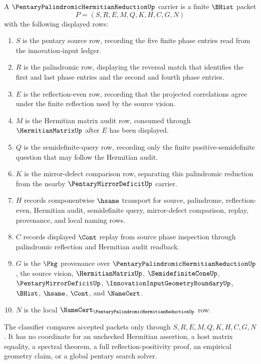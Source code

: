 \begin{definition}
\label{def:pentary-palindromic-hermitian-reduction-carrier}
A $\PentaryPalindromicHermitianReductionUp$ carrier is a finite $\BHist$ packet
$$
P=(S,R,E,M,Q,K,H,C,G,N)
$$
with the following displayed rows:
\begin{enumerate}
\item $S$ is the pentary source row, recording the five finite phase entries read from the innovation-input ledger.
\item $R$ is the palindromic row, displaying the reversal match that identifies the first and last phase entries and the second and fourth phase entries.
\item $E$ is the reflection-even row, recording that the projected correlations agree under the finite reflection used by the source vision.
\item $M$ is the Hermitian matrix audit row, consumed through $\HermitianMatrixUp$ after $E$ has been displayed.
\item $Q$ is the semidefinite-query row, recording only the finite positive-semidefinite question that may follow the Hermitian audit.
\item $K$ is the mirror-defect comparison row, separating this palindromic reduction from the nearby $\PentaryMirrorDeficitUp$ carrier.
\item $H$ records componentwise $\hsame$ transport for source, palindrome, reflection-even, Hermitian audit, semidefinite query, mirror-defect comparison, replay, provenance, and local naming rows.
\item $C$ records displayed $\Cont$ replay from source phase inspection through palindromic reflection and Hermitian audit readback.
\item $G$ is the $\Pkg$ provenance over $\PentaryPalindromicHermitianReductionUp$, the source vision, $\HermitianMatrixUp$, $\SemidefiniteConeUp$, $\PentaryMirrorDeficitUp$, $\InnovationInputGeometryBoundaryUp$, $\BHist$, $\hsame$, $\Cont$, and $\NameCert$.
\item $N$ is the local $\NameCert_{\PentaryPalindromicHermitianReductionUp}$ row.
\end{enumerate}
The classifier compares accepted packets only through $S,R,E,M,Q,K,H,C,G,N$. It has no coordinate for an unchecked Hermitian assertion, a host matrix equality, a spectral theorem, a full reflection-positivity proof, an empirical geometry claim, or a global pentary search solver.
\end{definition}

